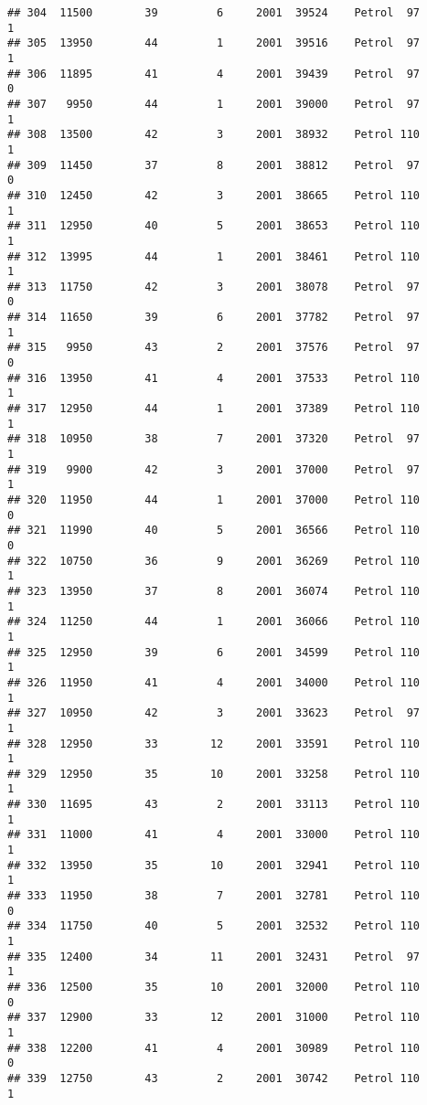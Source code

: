 \documentclass[]{article}
\begin{document}
\begin{verbatim}
## 304  11500        39         6     2001  39524    Petrol  97         1
## 305  13950        44         1     2001  39516    Petrol  97         1
## 306  11895        41         4     2001  39439    Petrol  97         0
## 307   9950        44         1     2001  39000    Petrol  97         1
## 308  13500        42         3     2001  38932    Petrol 110         1
## 309  11450        37         8     2001  38812    Petrol  97         0
## 310  12450        42         3     2001  38665    Petrol 110         1
## 311  12950        40         5     2001  38653    Petrol 110         1
## 312  13995        44         1     2001  38461    Petrol 110         1
## 313  11750        42         3     2001  38078    Petrol  97         0
## 314  11650        39         6     2001  37782    Petrol  97         1
## 315   9950        43         2     2001  37576    Petrol  97         0
## 316  13950        41         4     2001  37533    Petrol 110         1
## 317  12950        44         1     2001  37389    Petrol 110         1
## 318  10950        38         7     2001  37320    Petrol  97         1
## 319   9900        42         3     2001  37000    Petrol  97         1
## 320  11950        44         1     2001  37000    Petrol 110         0
## 321  11990        40         5     2001  36566    Petrol 110         0
## 322  10750        36         9     2001  36269    Petrol 110         1
## 323  13950        37         8     2001  36074    Petrol 110         1
## 324  11250        44         1     2001  36066    Petrol 110         1
## 325  12950        39         6     2001  34599    Petrol 110         1
## 326  11950        41         4     2001  34000    Petrol 110         1
## 327  10950        42         3     2001  33623    Petrol  97         1
## 328  12950        33        12     2001  33591    Petrol 110         1
## 329  12950        35        10     2001  33258    Petrol 110         1
## 330  11695        43         2     2001  33113    Petrol 110         1
## 331  11000        41         4     2001  33000    Petrol 110         1
## 332  13950        35        10     2001  32941    Petrol 110         1
## 333  11950        38         7     2001  32781    Petrol 110         0
## 334  11750        40         5     2001  32532    Petrol 110         1
## 335  12400        34        11     2001  32431    Petrol  97         1
## 336  12500        35        10     2001  32000    Petrol 110         0
## 337  12900        33        12     2001  31000    Petrol 110         1
## 338  12200        41         4     2001  30989    Petrol 110         0
## 339  12750        43         2     2001  30742    Petrol 110         1

\end{verbatim}
\end{document}

